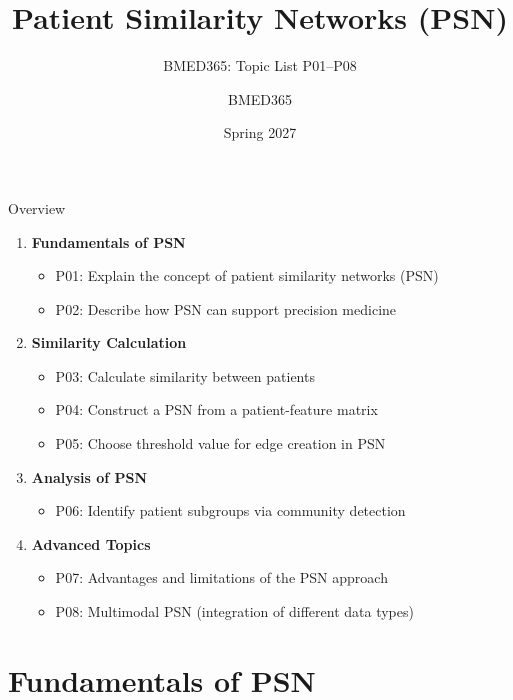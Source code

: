 \documentclass[aspectratio=169, 10pt]{beamer}
\title{Patient Similarity Networks (PSN)}
\subtitle{BMED365: Topic List P01--P08}
\author{BMED365}
\date{Spring 2027}
\begin{document}
\begin{frame}
    \titlepage
\end{frame}

\begin{frame}{Overview}
    \begin{enumerate}
        \item \textbf{Fundamentals of PSN}
        \begin{itemize}
            \item P01: Explain the concept of patient similarity networks (PSN)
            \item P02: Describe how PSN can support precision medicine
        \end{itemize}
        \item \textbf{Similarity Calculation}
        \begin{itemize}
            \item P03: Calculate similarity between patients
            \item P04: Construct a PSN from a patient-feature matrix
            \item P05: Choose threshold value for edge creation in PSN
        \end{itemize}
        \item \textbf{Analysis of PSN}
        \begin{itemize}
            \item P06: Identify patient subgroups via community detection
        \end{itemize}
        \item \textbf{Advanced Topics}
        \begin{itemize}
            \item P07: Advantages and limitations of the PSN approach
            \item P08: Multimodal PSN (integration of different data types)
        \end{itemize}
    \end{enumerate}
\end{frame}

\section{Fundamentals of PSN}
\end{document}
